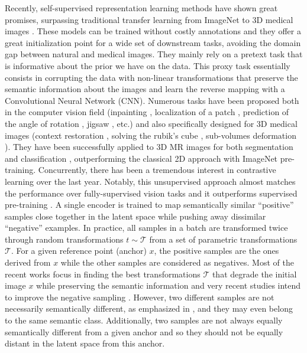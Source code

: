 \documentclass[runningheads]{llncs}
\begin{document}
Recently, self-supervised representation learning methods have shown great promises, surpassing traditional transfer learning from ImageNet to 3D medical images \cite{zhou2020genesis}. These models can be trained without costly annotations and they offer a great initialization point for a wide set of downstream tasks, avoiding the domain gap between natural and medical images. They mainly rely on a pretext task that is informative about the prior we have on the data. This proxy task essentially consists in corrupting the data with non-linear transformations that preserve the semantic information about the images and learn the reverse mapping with a Convolutional Neural Network (CNN). Numerous tasks have been proposed both in the computer vision field (inpainting \cite{pathak2016inpainting}, localization of a patch \cite{doersch2015patchloc}, prediction of the angle of rotation \cite{gidaris2018rot}, jigsaw \cite{noroozi2016jigsaw}, etc.) and also specifically designed for 3D medical images (context restoration \cite{chen2019self_supervision}, solving the rubik's cube \cite{zhuang2019rubikscube}, sub-volumes deformation \cite{zhou2020genesis}). They have been successfully applied to 3D MR images for both segmentation and classification \cite{zhuang2019rubikscube, tao2020rubikscube, taleb20203d, zhou2020genesis}, outperforming the classical 2D approach with ImageNet pre-training.
Concurrently, there has been a tremendous interest in contrastive learning \cite{hadsell2006dimensionality} over the last year. Notably, this unsupervised approach almost matches the performance over fully-supervised vision tasks and it outperforms supervised pre-training \cite{chen2020simCLR, caron2020unsupervised, he2020moco}. 
A single encoder is trained to map semantically similar ``positive'' samples close together in the latent space while pushing away dissimilar ``negative'' examples. In practice, all samples in a batch are transformed twice through random transformations $t\sim \mathcal{T}$ from a set of parametric transformations $\mathcal{T}$. For a given reference point (anchor) $x$, the positive samples are the ones derived from $x$ while the other samples are considered as negatives. Most of the recent works focus in finding the best transformations $\mathcal{T}$ that degrade the initial image $x$ while preserving the semantic information \cite{chen2020simCLR, tian2020} and very recent studies intend to improve the negative sampling \cite{robinson2020negative, chuang2020debiased}. However, two different samples are not necessarily semantically different, as emphasized in \cite{chuang2020debiased,wei2020co2}, and they may even belong to the same semantic class. Additionally, two samples are not always equally semantically different from a given anchor and so they should not be equally distant in the latent space from this anchor.
\end{document}
